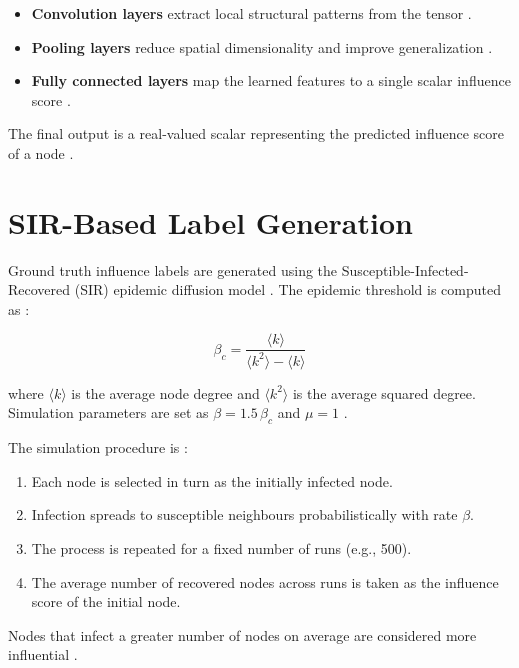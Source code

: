\begin{itemize}
    \item \textbf{Convolution layers} extract local structural patterns 
    from the tensor \cite{tu2025, zhang2019gcn}.
    \item \textbf{Pooling layers} reduce spatial dimensionality and 
    improve generalization \cite{tu2025}.
    \item \textbf{Fully connected layers} map the learned features to 
    a single scalar influence score \cite{guo2026, patel2025}.
\end{itemize}

The final output is a real-valued scalar representing the predicted 
influence score of a node \cite{guo2026}.

\section{SIR-Based Label Generation}

Ground truth influence labels are generated using the 
Susceptible-Infected-Recovered (SIR) epidemic diffusion model 
\cite{ chen2012}. The epidemic threshold is computed as 
\cite{guo2026}:

\begin{equation}
\beta_c = \frac{\langle k \rangle}{\langle k^2 \rangle - 
\langle k \rangle}
\end{equation}

\noindent where $\langle k \rangle$ is the average node degree and 
$\langle k^2 \rangle$ is the average squared degree. Simulation 
parameters are set as $\beta = 1.5\,\beta_c$ and $\mu = 1$ 
\cite{guo2026, patel2025}.

The simulation procedure is \cite{ chen2012}:
\begin{enumerate}
    \item Each node is selected in turn as the initially infected node.
    \item Infection spreads to susceptible neighbours probabilistically 
    with rate $\beta$.
    \item The process is repeated for a fixed number of runs 
    (e.g., 500).
    \item The average number of recovered nodes across runs is taken 
    as the influence score of the initial node.
\end{enumerate}

Nodes that infect a greater number of nodes on average are considered 
more influential \cite{chen2012}.


